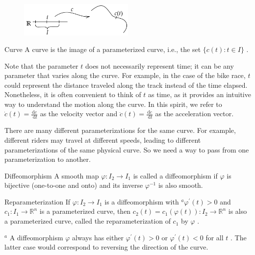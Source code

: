 \begin{figure}[h]
    \centering
    \includegraphics[width=0.5\textwidth]{fig/1.1.png}
\end{figure}

\begin{definition}{Curve}
    A curve is the image of a parameterized curve, i.e., the set \(\{ c\left( t\right)  : t \in  I\}\) .
\end{definition}


Note that the parameter \(t\) does not necessarily represent time; it can be any parameter that varies along the curve. For example, in the case of the bike race, \(t\) could represent the distance traveled along the track instead of the time elapsed. Nonetheless, it is often convenient to think of \(t\) as time, as it provides an intuitive way to understand the motion along the curve. In this spirit, we refer to \(\dot{c}\left( t\right)  = \frac{\mathrm{d}c}{\mathrm{\;d}t}\) as the velocity vector and \(\ddot{c}\left( t\right)  = \frac{\mathrm{d}\dot{c}}{\mathrm{\;d}t}\) as the acceleration vector.

There are many different parameterizations for the same curve. For example, different riders may travel at different speeds, leading to different parameterizations of the same physical curve. So we need a way to pass from one parameterization to another.

\begin{definition}{Diffeomorphism}
    A smooth map \(\varphi  : {I}_{2} \rightarrow  {I}_{1}\) is called a diffeomorphism if \(\varphi\) is bijective (one-to-one and onto) and its inverse \({\varphi }^{-1}\) is also smooth.
\end{definition}

\begin{definition}{Reparameterization}
    If \(\varphi  : {I}_{2} \rightarrow  {I}_{1}\) is a diffeomorphism with \({}^{a}{\varphi }^{\prime }\left( t\right)  > 0\) and \({c}_{1} : {I}_{1} \rightarrow  {\mathbb{R}}^{n}\) is a parameterized curve, then \({c}_{2}\left( t\right)  = {c}_{1}\left( {\varphi \left( t\right) }\right)  : {I}_{2} \rightarrow  {\mathbb{R}}^{n}\) is also a parameterized curve, called the reparameterization of \({c}_{1}\) by \(\varphi\) .

\({}^{a}\) A diffeomorphism \(\varphi\) always has either \({\varphi }^{\prime }\left( t\right)  > 0\) or \({\varphi }^{\prime }\left( t\right)  < 0\) for all \(t\) . The latter case would correspond to reversing the direction of the curve.
\end{definition}




